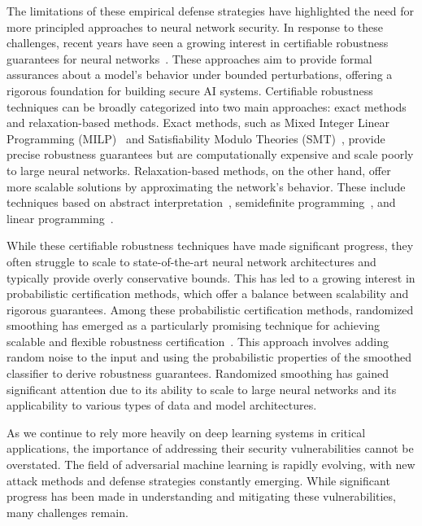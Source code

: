 The limitations of these empirical defense strategies have highlighted the need for more principled approaches to neural network security.
In response to these challenges, recent years have seen a growing interest in certifiable robustness guarantees for neural networks~\citep{cohen2019certified}.
These approaches aim to provide formal assurances about a model's behavior under bounded perturbations, offering a rigorous foundation for building secure AI systems.
Certifiable robustness techniques can be broadly categorized into two main approaches: exact methods and relaxation-based methods.
Exact methods, such as Mixed Integer Linear Programming (MILP)~\citep{tjeng2017evaluating} and Satisfiability Modulo Theories (SMT)~\citep{katz2017reluplex}, provide precise robustness guarantees but are computationally expensive and scale poorly to large neural networks.
Relaxation-based methods, on the other hand, offer more scalable solutions by approximating the network's behavior.
These include techniques based on abstract interpretation~\citep{gehr2018ai2}, semidefinite programming~\citep{raghunathan2018semidefinite}, and linear programming~\citep{wong2018provable}.

While these certifiable robustness techniques have made significant progress, they often struggle to scale to state-of-the-art neural network architectures and typically provide overly conservative bounds.
This has led to a growing interest in probabilistic certification methods, which offer a balance between scalability and rigorous guarantees.
Among these probabilistic certification methods, randomized smoothing has emerged as a particularly promising technique for achieving scalable and flexible robustness certification~\citep{cohen2019certified}.
This approach involves adding random noise to the input and using the probabilistic properties of the smoothed classifier to derive robustness guarantees.
Randomized smoothing has gained significant attention due to its ability to scale to large neural networks and its applicability to various types of data and model architectures.

As we continue to rely more heavily on deep learning systems in critical applications, the importance of addressing their security vulnerabilities cannot be overstated.
The field of adversarial machine learning is rapidly evolving, with new attack methods and defense strategies constantly emerging.
While significant progress has been made in understanding and mitigating these vulnerabilities, many challenges remain.

